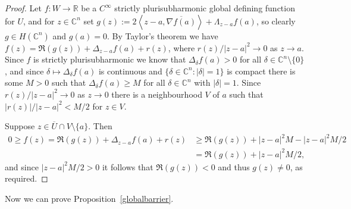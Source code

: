 \documentclass[11pt,a4paper, final, twoside]{article}
\numberwithin{equation}{section}
\newcommand{\C}{\mathbb C}
\newcommand{\R}{\mathbb R}
\newcommand{\con}[1]{\overline{#1}}
\newcommand{\clos}[1]{\overline{#1}}
\newcommand{\hol}{H}
\newcommand{\cts}{C}
\renewcommand{\sp}[2]{\left<#1,#2\right>}
\newcommand{\sprod}[2]{\sp{#1}{#2}}
\newcommand{\cgrad}[1]{\nabla #1}
\begin{document}
\begin{proof}
Let $f\colon W\to\R$ be a $\cts^\infty$ strictly plurisubharmonic global defining function for $U$, and for $z\in\C^n$ set $g(z):=2\sprod{z-a}{\con{\cgrad{f}(a)}}+\Lambda_{z-a} f(a)$,
so clearly $g\in\hol(\C^n)$ and $g(a)=0$. By Taylor's theorem we have $f(z) = \Re(g(z))+\Delta_{z-a} f(a) + r(z)$, where $r(z)/|z-a|^2\to 0$ as $z\to a$. Since $f$ is strictly plurisubharmonic we know
that $\Delta_\delta f(a)>0$ for all $\delta\in\C^n\setminus\{0\}$, and since $\delta\mapsto \Delta_\delta f(a)$ is continuous and $\{\delta\in\C^n\colon|\delta|=1\}$ is compact there is some $M>0$ such that
$\Delta_\delta f(a)\geq M$ for all $\delta\in\C^n$ with $|\delta|=1$. Since $r(z)/|z-a|^2\to 0$ as $z\to 0$ there is a neighbourhood $V$ of $a$ such that $|r(z)|/|z-a|^2<M/2$ for $z\in V$.

Suppose $z\in \clos{U}\cap V\setminus\{a\}$. Then
\begin{align*}
 0\geq f(z) = \Re(g(z)) + \Delta_{z-a} f(a) + r(z) &\geq \Re(g(z)) + |z-a|^2 M - |z-a|^2M/2\\
	&= \Re(g(z))+|z-a|^2 M/2,
\end{align*}
and since $|z-a|^2M/2>0$ it follows that $\Re(g(z))<0$ and thus $g(z)\neq 0$, as required.
\end{proof}
Now we can prove Proposition~\ref{globalbarrier}.
\end{document}
